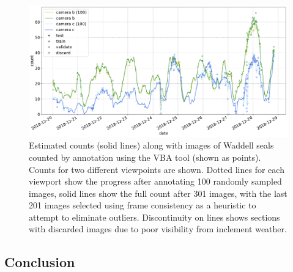 \begin{figure}[ht]
    \centering
    \includegraphics[width=1.0\linewidth]{charts/seals/scott_base_combined.pdf}
    \caption{Estimated counts (solid lines) along with images of Waddell seals counted by annotation using the \gls{VBA} tool (shown as points). Counts for two different viewpoints are shown. Dotted lines for each viewport show the progress after annotating 100 randomly sampled images, solid lines show the full count after 301 images, with the last 201 images selected using frame consistency as a heuristic to attempt to eliminate outliers. Discontinuity on lines shows sections with discarded images due to poor visibility from inclement weather. }
    \label{fig:scott_base}
\end{figure}


\subsection{Conclusion}
\label{sec:seal_conclusion}